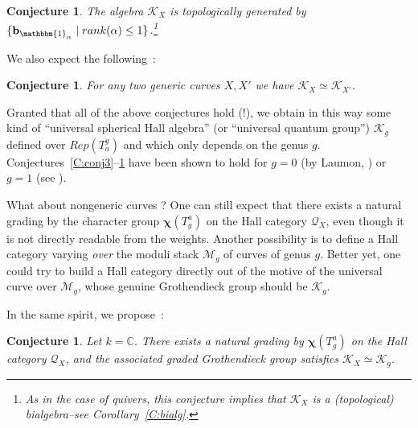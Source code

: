 \documentclass[a4paper,10pt]{amsart}
\def\a{\alpha}
\def\C{\mathbb{C}}
\newtheorem{conj}[theo]{Conjecture}
\numberwithin{equation}{section}
\begin{document}
\vspace{.1in}

\begin{conj}\label{C:conj4} The algebra $\mathcal{K}_X$ is topologically generated by $\{\mathbf{b}_{\mathbbm{1}_{\a}}\;|\; rank(\a) \leq 1\}$.\footnote{As in the case of quivers, this conjecture implies that $\mathcal{K}_X$ is a (topological) bialgebra--see Corollary~\ref{C:bialg}.}
\end{conj}

\vspace{.1in}

We also expect the following~:

\vspace{.1in}

\begin{conj}\label{C:conj5} For any two generic curves $X,X'$ we have $\mathcal{K}_X \simeq \mathcal{K}_{X'}$.
\end{conj}

\vspace{.1in}

Granted that all of the above conjectures hold (!), we obtain in this way some kind of ``universal spherical Hall algebra'' (or ``universal quantum group'')  $\mathcal{K}_{g}$ defined over $Rep(T^g_a)$ and which only depends on the genus $g$. Conjectures~\ref{C:conj3}--\ref{C:conj5} have been shown to hold for $g=0$ (by Laumon, \cite{Laumon}) or $g=1$ (see \cite{Scano}). 

\vspace{.1in}

What about nongeneric curves ? One can still expect that there exists a natural grading by the character group $\boldsymbol{\chi}(T^a_g)$ on the Hall category $\mathcal{Q}_{X}$, even though it is not directly readable from the weights. Another possibility is to define a Hall category varying \textit{over} the moduli stack $\mathcal{M}_g$ of curves of genus $g$. Better yet, one could try to build a Hall category directly out of the motive of the universal curve over $\mathcal{M}_g$, whose genuine Grothendieck group should be $\mathcal{K}_{g}$. 

\vspace{.1in}

In the same spirit, we propose~:

\vspace{.1in}

\begin{conj}\label{C:conj6} Let $k=\C$. There exists a natural grading by $\boldsymbol{\chi}(T^a_g)$ on the Hall category $\mathcal{Q}_X$, and the associated graded Grothendieck group satisfies $\mathcal{K}_X \simeq \mathcal{K}_{g}$.
\end{conj}
\end{document}
